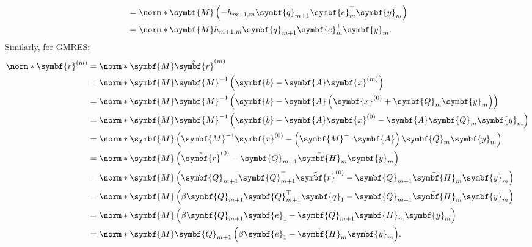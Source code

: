 \documentclass{article}
\begin{document}
\begin{appendix}
\begin{align*}
                                             & = \norm*{\symbf{M} \left( - h_{m+1,m} \symbf{q}_{m+1} \symbf{e}_m^\top \symbf{y}_m \right)}                                                                                            \\
                                             & = \norm*{\symbf{M} h_{m+1,m} \symbf{q}_{m+1} \symbf{e}_m^\top \symbf{y}_m}.
    \end{align*}
    Similarly, for GMRES:
    \begin{align*}
        \norm*{\symbf{r}^{\left( m \right)}} & = \norm*{\symbf{M} \tilde{\symbf{r}}^{\left( m \right)}}                                                                                                     \\
                                             & = \norm*{\symbf{M} \symbf{M}^{-1} \left( \symbf{b} - \symbf{A} \symbf{x}^{\left( m \right)} \right)}                                                         \\
                                             & = \norm*{\symbf{M} \symbf{M}^{-1} \left( \symbf{b} - \symbf{A} \left( \symbf{x}^{\left( 0 \right)} + \symbf{Q}_m \symbf{y}_m \right) \right)}                \\
                                             & = \norm*{\symbf{M} \symbf{M}^{-1} \left( \symbf{b} - \symbf{A} \symbf{x}^{\left( 0 \right)} - \symbf{A} \symbf{Q}_m \symbf{y}_m \right)}                     \\
                                             & = \norm*{\symbf{M} \left( \symbf{M}^{-1} \symbf{r}^{\left( 0 \right)} - \left( \symbf{M}^{-1} \symbf{A} \right) \symbf{Q}_m \symbf{y}_m \right)}             \\
                                             & = \norm*{\symbf{M} \left( \tilde{\symbf{r}}^{\left( 0 \right)} - \symbf{Q}_{m+1} \bar{\symbf{H}}_m \symbf{y}_m \right)}                                      \\
                                             & = \norm*{\symbf{M} \left( \symbf{Q}_{m+1} \symbf{Q}_{m+1}^\top \tilde{\symbf{r}}^{\left( 0 \right)} - \symbf{Q}_{m+1} \bar{\symbf{H}}_m \symbf{y}_m \right)} \\
                                             & = \norm*{\symbf{M} \left( \beta \symbf{Q}_{m+1} \symbf{Q}_{m+1}^\top \symbf{q}_1 - \symbf{Q}_{m+1} \bar{\symbf{H}}_m \symbf{y}_m \right)}                    \\
                                             & = \norm*{\symbf{M} \left( \beta \symbf{Q}_{m+1} \symbf{e}_1 - \symbf{Q}_{m+1} \bar{\symbf{H}}_m \symbf{y}_m \right)}                                         \\
                                             & = \norm*{\symbf{M} \symbf{Q}_{m+1} \left( \beta \symbf{e}_1 - \bar{\symbf{H}}_m \symbf{y}_m \right)}.
    \end{align*}

\end{appendix}
\end{document}
